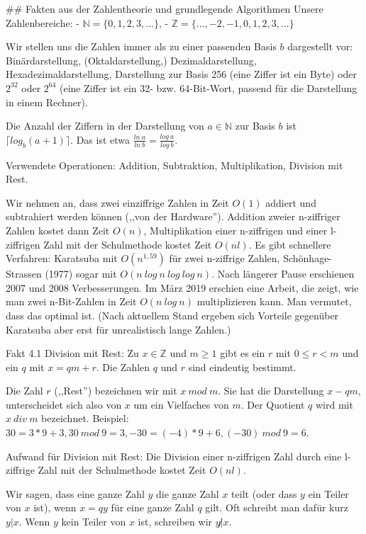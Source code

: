 \documentclass[a4paper]{article}
\begin{document}
\begin{multicols}{3}
        ## Fakten aus der Zahlentheorie und grundlegende Algorithmen
        Unsere Zahlenbereiche:
        - $\mathbb{N}=\{ 0 , 1 , 2 , 3 ,...\}$,
        - $\mathbb{Z}=\{...,- 2 ,- 1 , 0 , 1 , 2 , 3 ,...\}$

        Wir stellen uns die Zahlen immer als zu einer passenden Basis $b$ dargestellt vor: Binärdarstellung, (Oktaldarstellung,) Dezimaldarstellung, Hexadezimaldarstellung, Darstellung zur Basis 256 (eine Ziffer ist ein Byte) oder $2^{32}$ oder $2^{64}$ (eine Ziffer ist ein 32- bzw. 64-Bit-Wort, passend für die Darstellung in einem Rechner).

        Die Anzahl der Ziffern in der Darstellung von $a\in\mathbb{N}$ zur Basis $b$ ist $\lceil  log_b(a+1)\rceil$. Das ist etwa $\frac{ln\ a}{ln\ b}=\frac{log\ a}{log\ b}$.

        Verwendete Operationen: Addition, Subtraktion, Multiplikation, Division mit Rest.

        Wir nehmen an, dass zwei einziffrige Zahlen in Zeit $O(1)$ addiert und subtrahiert werden können (,,von der Hardware''). Addition zweier n-ziffriger Zahlen kostet dann Zeit $O(n)$, Multiplikation einer n-ziffrigen und einer l-ziffrigen Zahl mit der Schulmethode kostet Zeit $O(nl)$. Es gibt schnellere Verfahren: Karatsuba mit $O(n^{1,59})$ für zwei n-ziffrige Zahlen, Schönhage-Strassen (1977) sogar mit $O(n\ log\ n\ log\ log\ n)$. Nach längerer Pause erschienen 2007 und 2008 Verbesserungen. Im März 2019 erschien eine Arbeit, die zeigt, wie man zwei n-Bit-Zahlen in Zeit $O(n\ log\ n)$ multiplizieren kann. Man vermutet, dass das optimal ist. (Nach aktuellem Stand ergeben sich Vorteile gegenüber Karatsuba aber erst für unrealistisch lange Zahlen.)

        Fakt 4.1 Division mit Rest: Zu $x\in\mathbb{Z}$ und $m\geq 1$ gibt es ein $r$ mit $0\leq r < m$ und ein $q$ mit $x=qm+r$. Die Zahlen $q$ und $r$ sind eindeutig bestimmt.

        Die Zahl $r$ (,,Rest'') bezeichnen wir mit $x\ mod\ m$. Sie hat die Darstellung $x-qm$, unterscheidet sich also von $x$ um ein Vielfaches von $m$. Der Quotient $q$ wird mit $x\ div\ m$ bezeichnet.
        Beispiel: $30 = 3*9 + 3, 30\ mod\ 9 = 3, -30 = (-4) *9 + 6, (-30)\ mod\ 9 = 6$.

        Aufwand für Division mit Rest: Die Division einer n-ziffrigen Zahl durch eine l-ziffrige Zahl mit der Schulmethode kostet Zeit $O(nl)$.

        Wir sagen, dass eine ganze Zahl $y$ die ganze Zahl $x$ teilt (oder dass $y$ ein Teiler von $x$ ist), wenn $x=qy$ für eine ganze Zahl $q$ gilt. Oft schreibt man dafür kurz $y|x$. Wenn $y$ kein Teiler von $x$ ist, schreiben wir $y\not|x$.


\end{multicols}
\end{document}
